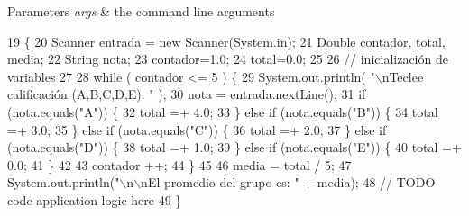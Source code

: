 \begin{DoxyParams}{Parameters}
{\em args} & the command line arguments \\
\hline
\end{DoxyParams}

\begin{DoxyCode}
19                                            \{
20          Scanner entrada = \textcolor{keyword}{new} Scanner(System.in);  
21         Double contador, total, media;
22       String nota;
23       contador=1.0;
24       total=0.0;
25  
26       \textcolor{comment}{// inicialización de variables}
27   
28        \textcolor{keywordflow}{while} ( contador <= 5 ) \{
29          System.out.println( \textcolor{stringliteral}{"\(\backslash\)nTeclee calificación (A,B,C,D,E): "} );
30          nota = entrada.nextLine();       
31          \textcolor{keywordflow}{if} (nota.equals(\textcolor{stringliteral}{"A"})) \{
32                 total =+ 4.0;
33          \} \textcolor{keywordflow}{else} \textcolor{keywordflow}{if} (nota.equals(\textcolor{stringliteral}{"B"})) \{
34                 total =+ 3.0;
35          \} \textcolor{keywordflow}{else} \textcolor{keywordflow}{if} (nota.equals(\textcolor{stringliteral}{"C"})) \{
36                 total =+ 2.0;
37          \} \textcolor{keywordflow}{else} \textcolor{keywordflow}{if} (nota.equals(\textcolor{stringliteral}{"D"})) \{
38                 total =+ 1.0;
39          \} \textcolor{keywordflow}{else} \textcolor{keywordflow}{if} (nota.equals(\textcolor{stringliteral}{"E"})) \{
40                 total =+ 0.0;
41          \}
42  
43          contador ++;
44       \}
45   
46       media = total / 5;
47       System.out.println(\textcolor{stringliteral}{"\(\backslash\)n\(\backslash\)nEl promedio del grupo es: "} + media);
48         \textcolor{comment}{// TODO code application logic here}
49     \}
\end{DoxyCode}
